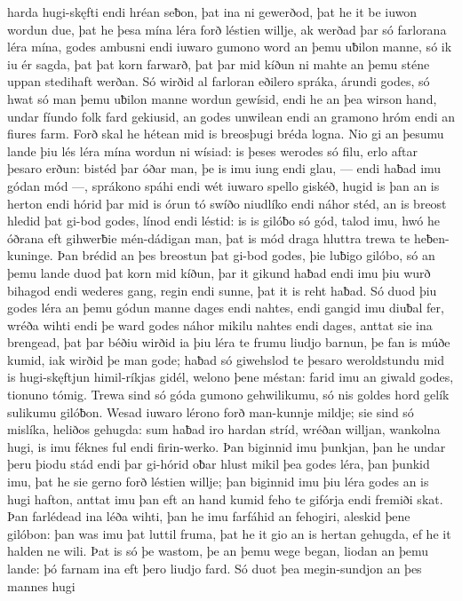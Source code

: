 harda hugi-skęfti endi hréan seƀon,
þat ina ni gewerðod, þat he it be iuwon wordun due,
þat he þesa mína léra forð léstien willje,
ak werðad þar só farlorana léra mína,
godes ambusni endi iuwaro gumono word
an þemu uƀilon manne, só ik iu ér sagda,
þat þat korn farwarð, þat þar mid kíðun ni mahte
an þemu sténe uppan stedihaft werðan.
Só wirðid al farloran eðilero spráka,
árundi godes, só hwat só man þemu uƀilon manne
wordun gewísid, endi he an þea wirson hand,
undar fíundo folk fard gekiusid,
an godes unwilean endi an gramono hróm
endi an fiures farm. Forð skal he hétean
mid is breosþugi bréda logna.
Nio gi an þesumu lande þiu lés léra mína
wordun ni wísiad: is þeses werodes só filu,
erlo aftar þesaro erðun: bistéd þar óðar man,
þe is imu iung endi glau, — endi haƀad imu gódan mód —,
sprákono spáhi endi wét iuwaro spello giskéð,
hugid is þan an is herton endi hórid þar mid is órun tó
swíðo niudlíko endi náhor stéd,
an is breost hledid þat gi-bod godes,
línod endi léstid: is is gilóƀo só gód,
talod imu, hwó he óðrana eft gihwerƀie
mén-dádigan man, þat is mód draga
hluttra trewa te heƀen-kuninge.
Þan brédid an þes breostun þat gi-bod godes,
þie luƀigo gilóbo, só an þemu lande duod
þat korn mid kíðun, þar it gikund haƀad
endi imu þiu wurð bihagod endi wederes gang,
regin endi sunne, þat it is reht haƀad.
Só duod þiu godes léra an þemu gódun manne
dages endi nahtes, endi gangid imu diuƀal fer,
wréða wihti endi þe ward godes
náhor mikilu nahtes endi dages,
anttat sie ina brengead, þat þar béðiu wirðid
ia þiu léra te frumu liudjo barnun,
þe fan is múðe kumid, iak wirðid þe man gode;
haƀad só giwehslod te þesaro weroldstundu
mid is hugi-skęftjun himil-ríkjas gidél,
welono þene méstan: farid imu an giwald godes,
tionuno tómig. Trewa sind só góda
gumono gehwilikumu, só nis goldes hord
gelík sulikumu gilóƀon. Wesad iuwaro lérono forð
man-kunnje mildje; sie sind só mislíka,
heliðos gehugda: sum haƀad iro hardan stríd,
wréðan willjan, wankolna hugi,
is imu féknes ful endi firin-werko.
Þan biginnid imu þunkjan, þan he undar þeru þiodu stád
endi þar gi-hórid oƀar hlust mikil
þea godes léra, þan þunkid imu, þat he sie gerno forð
léstien willje; þan biginnid imu þiu léra godes
an is hugi hafton, anttat imu þan eft an hand kumid
feho te gifórja endi fremiði skat.
Þan farlédead ina léða wihti,
þan he imu farfáhid an fehogiri,
aleskid þene gilóbon: þan was imu þat luttil fruma,
þat he it gio an is hertan gehugda, ef he it halden ne wili.
Þat is só þe wastom, þe an þemu wege began,
liodan an þemu lande: þó farnam ina eft þero liudjo fard.
Só duot þea megin-sundjon an þes mannes hugi
